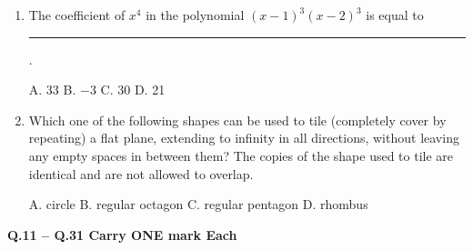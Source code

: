 \documentclass[journal,12pt,onecolumn]{IEEEtran}
\begin{document}
\begin{enumerate}
    \item The coefficient of $x^4$ in the polynomial $(x-1)^3(x-2)^3$ is equal to \rule{3cm}{0.15mm}.

    A. 33 \quad
    B. $-3$ \quad
    C. 30 \quad
    D. 21

    \item Which one of the following shapes can be used to tile (completely cover by repeating) a flat plane, extending to infinity in all directions, without leaving any empty spaces in between them? The copies of the shape used to tile are identical and are not allowed to overlap.

    A. circle \quad
    B. regular octagon \quad
    C. regular pentagon \quad
    D. rhombus
\end{enumerate}

\textbf{Q.11 -- Q.31 Carry ONE mark Each}
\end{document}
